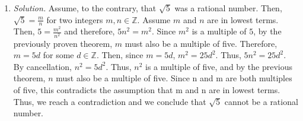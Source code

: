 \documentclass{article}
\newcommand{\zz}{\mathbb Z}
\begin{document}
\begin{enumerate}
    \item \emph{Solution.} 
    Assume, to the contrary, that $\sqrt{5}$ was a rational number. Then, $\sqrt{5} = \frac{m}{n}$
    for two integers $m, n \in \zz$. Assume $m$ and $n$ are in lowest terms. Then, $5 = \frac{m^2}{n^2}$
    and therefore, $5n^2 = m^2$. Since $m^2$ is a multiple of $5$, by the previously 
    proven theorem, $m$ must also be a multiple of five. Therefore, $m = 5d$ for some 
    $d \in \zz$. Then, since $m = 5d$, $m^2 = 25d^2$. Thus, $5n^2 = 25d^2$. By cancellation, 
    $n^2 = 5d^2$. Thus, $n^2$ is a multiple of five, and by the previous theorem, $n$ must 
    also be a multiple of five. Since n and m are both multiples of five, this contradicts
    the assumption that m and n are in lowest terms. Thus, we reach a contradiction and we 
    conclude that $\sqrt{5}$ cannot be a rational number.
\end{enumerate}
\end{document}

